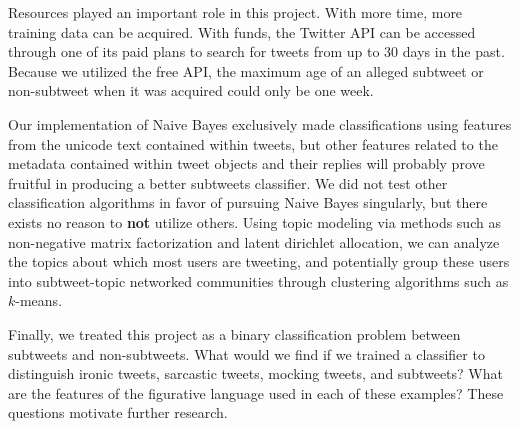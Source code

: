 \documentclass[11pt, twoside, reqno]{book}
\begin{document}
Resources played an important role in this project. With more time, more training data can be acquired. With funds, the Twitter API can be accessed through one of its paid plans to search for tweets from up to 30 days in the past. Because we utilized the free API, the maximum age of an alleged subtweet or non-subtweet when it was acquired could only be one week. 

Our implementation of Naive Bayes exclusively made classifications using features from the unicode text contained within tweets, but other features related to the metadata contained within tweet objects and their replies will probably prove fruitful in producing a better subtweets classifier. We did not test other classification algorithms in favor of pursuing Naive Bayes singularly, but there exists no reason to \textbf{not} utilize others. Using topic modeling via methods such as non-negative matrix factorization and latent dirichlet allocation, we can analyze the topics about which most users are tweeting, and potentially group these users into subtweet-topic networked communities through clustering algorithms such as $k$-means.

Finally, we treated this project as a binary classification problem between subtweets and non-subtweets. What would we find if we trained a classifier to distinguish ironic tweets, sarcastic tweets, mocking tweets, and subtweets? What are the features of the figurative language used in each of these examples? These questions motivate further research.
\end{document}
